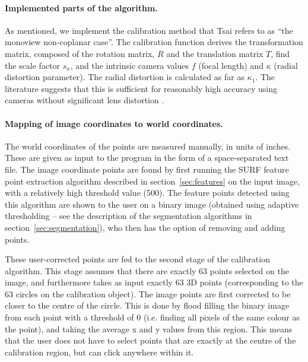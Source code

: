 \paragraph{Implemented parts of the algorithm.}
As mentioned, we implement the calibration method that Tsai refers to
as ``the monoview non-coplanar case''. The calibration function derives
the transformation matrix, composed of the rotation matrix, $R$ and
the translation matrix $T$, find the scale factor $s_x$, and the
intrinsic camera values $f$ (focal length) and $\kappa$ (radial
distortion parameter). The radial distortion is calculated as far as
$\kappa_1$. The literature suggests that this is sufficient for
reasonably high accuracy using cameras without significant lens
distortion \cite{algebraic-distortion}.

\paragraph{Mapping of image coordinates to world coordinates.}
The world coordinates of the points are measured manually, in units of
inches. These are given as input to the program in the form of a
space-separated text file. The image coordinate points are found by
first running the SURF feature point extraction algorithm described in
section~\ref{sec:features} on the input image, with a relatively high
threshold value (500). The feature points detected using this
algorithm are shown to the user on a binary image (obtained using
adaptive thresholding -- see the description of the segmentation
algorithms in section~\ref{sec:segmentation}), who then has the option
of removing and adding points.

These user-corrected points are fed to the second stage of the
calibration algorithm. This stage assumes that there are exactly 63
points selected on the image, and furthermore takes as input exactly
63 3D points (corresponding to the 63 circles on the calibration
object). The image points are first corrected to be closer to the
centre of the circle. This is done by flood filling the binary image
from each point with a threshold of 0 (i.e. finding all pixels of the
same colour as the point), and taking the average x and y values from
this region. This means that the user does not have to select points
that are exactly at the centre of the calibration region, but can
click anywhere within it.

